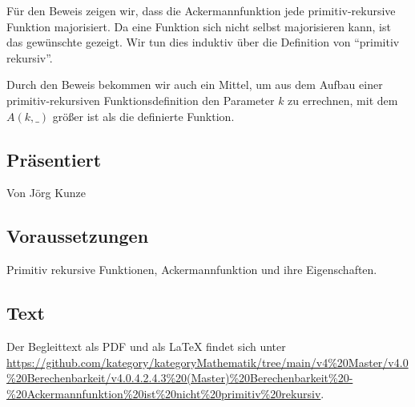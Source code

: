 \documentclass[a4paper]{amsart}
\theoremstyle{definition}
\begin{document}
Für den Beweis zeigen wir, dass die Ackermannfunktion jede primitiv-rekursive Funktion majorisiert. Da
eine Funktion sich nicht selbst majorisieren kann, ist das gewünschte gezeigt. Wir tun dies induktiv
über die Definition von "`primitiv rekursiv"'.

Durch den Beweis bekommen wir auch ein Mittel, um aus dem Aufbau einer primitiv-rekursiven Funktionsdefinition
den Parameter $k$ zu errechnen, mit dem $A( k, \_ )$ größer ist als die definierte Funktion.

\subsection*{Präsentiert}
Von Jörg Kunze

\subsection*{Voraussetzungen}
Primitiv rekursive Funktionen, Ackermannfunktion und ihre Eigenschaften.

\subsection*{Text}
Der Begleittext als PDF und als LaTeX findet sich unter
\url{https://github.com/kategory/kategoryMathematik/tree/main/v4%20Master/v4.0%20Berechenbarkeit/v4.0.4.2.4.3%20(Master)%20Berechenbarkeit%20-%20Ackermannfunktion%20ist%20nicht%20primitiv%20rekursiv}.

\end{document}
